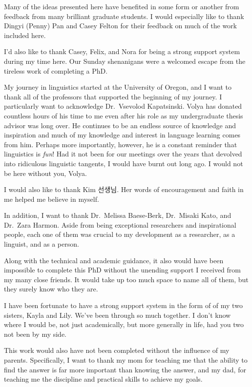 \documentclass[
  letterpaper,
  DIV=11,
  numbers=noendperiod,
  nottoc]{scrreprt}
\begin{document}
Many of the ideas presented here have benefited in some form or another
from feedback from many brilliant graduate students. I would especially
like to thank Dingyi (Penny) Pan and Casey Felton for their feedback on
much of the work included here.

I'd also like to thank Casey, Felix, and Nora for being a strong support
system during my time here. Our Sunday shenanigans were a welcomed
escape from the tireless work of completing a PhD.

My journey in linguistics started at the University of Oregon, and I
want to thank all of the professors that supported the beginning of my
journey. I particularly want to acknowledge Dr.~Vsevolod Kapatsinski.
Volya has donated countless hours of his time to me even after his role
as my undergraduate thesis advisor was long over. He continues to be an
endless source of knowledge and inspiration and much of my knowledge and
interest in language learning comes from him. Perhaps more importantly,
however, he is a constant reminder that linguistics is \emph{fun}! Had
it not been for our meetings over the years that devolved into
ridiculous linguistic tangents, I would have burnt out long ago. I would
not be here without you, Volya.

I would also like to thank Kim 선생님. Her words of encouragement and
faith in me helped me believe in myself.

In addition, I want to thank Dr.~Melissa Baese-Berk, Dr.~Misaki Kato,
and Dr.~Zara Harmon. Aside from being exceptional researchers and
inspirational people, each one of them was crucial to my development as
a researcher, as a linguist, and as a person.

Along with the technical and academic guidance, it also would have been
impossible to complete this PhD without the unending support I received
from my many close friends. It would take up too much space to name all
of them, but they surely know who they are.

I have been fortunate to have a strong support system in the form of of
my two sisters, Kayla and Lily. We've been through so much together. I
don't know where I would be, not just academically, but more generally
in life, had you two not been by my side.

This work would also have not been completed without the influence of my
parents. Specifically, I want to thank my mom for teaching me that the
ability to find the answer is far more important than knowing the
answer, and my dad, for teaching me the discipline and practical skills
to achieve my goals.
\end{document}
